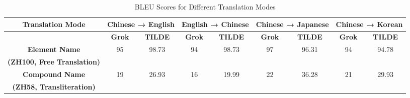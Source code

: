 \documentclass[conference]{IEEEtran}
\begin{document}
\begin{CJK*}{UTF8}{gbsn}
\begin{table}[htbp]
\centering
\caption{BLEU Scores for Different Translation Modes}
\label{tab:bleu_translation_modes}
\begin{tabular}{|c|c|c|c|c|c|c|c|c|}
\hline
\textbf{Translation Mode} & \multicolumn{2}{c|}{\textbf{Chinese → English}} & \multicolumn{2}{c|}{\textbf{English → Chinese}} & \multicolumn{2}{c|}{\textbf{Chinese → Japanese}} & \multicolumn{2}{c|}{\textbf{Chinese → Korean}} \\
\hline
 & \textbf{Grok} & \textbf{TILDE} & \textbf{Grok} & \textbf{TILDE} & \textbf{Grok} & \textbf{TILDE} & \textbf{Grok} & \textbf{TILDE} \\
\hline
\textbf{Element Name} & 95 & 98.73 & 94 & 98.73 & 97 & 96.31 & 94 & 94.78 \\
\textbf{(ZH100, Free Translation)} & & & & & & & & \\
\hline
\textbf{Compound Name} & 19 & 26.93 & 16 & 19.99 & 22 & 36.28 & 21 & 29.93 \\
\textbf{(ZH58, Transliteration)} & & & & & & & & \\
\hline
\end{tabular}
\end{table}





\end{CJK*}
\end{document}
